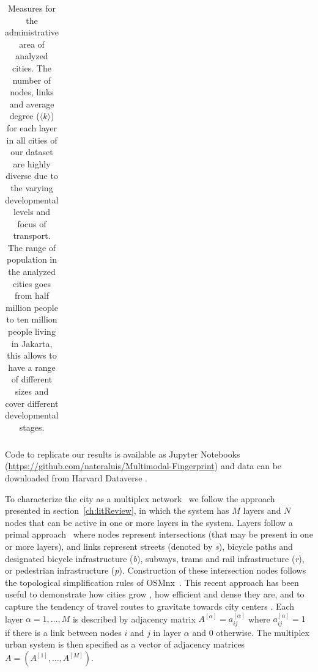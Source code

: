 \begin{table}[ht!]
\begin{adjustbox}{width=\textwidth,keepaspectratio}
\begin{tabular}{l|rrr|rrr|rrr|rrr|r}
		\end{tabular}
	\end{adjustbox}
	\caption[Layers measures for analyzed cities]{Measures for the administrative area of analyzed cities. The number of nodes, links and average degree ($\langle k \rangle$) for each layer in all cities of our dataset are highly diverse due to the varying developmental levels and focus of transport. The range of population in the analyzed cities goes from half million people to ten million people living in Jakarta, this allows to
		have a range of different sizes and cover different developmental stages.
		\label{tab:MultiplexCities}}
\end{table}

Code to replicate our results is available as Jupyter Notebooks (\url{https://github.com/nateraluis/Multimodal-Fingerprint}) and data can be downloaded from Harvard Dataverse \cite{natera2019data}.

To characterize the city as a multiplex network~\cite{boccaletti2014structure,kivela2014multilayer,battiston2017new} we follow the approach presented in section~\ref{ch:litReview}, in which the system has $M$ layers and $N$ nodes that can be active in one or more layers in the system. Layers follow a primal approach~\cite{porta2006primal} where nodes represent intersections (that may be present in one or more layers), and links represent streets (denoted by \textit{s}), bicycle paths and designated bicycle infrastructure (\textit{b}), subways, trams and rail infrastructure (\textit{r}), or pedestrian infrastructure (\textit{p}). Construction of these intersection nodes follows the topological simplification rules of OSMnx~\cite{boeing2017osmnx}. This recent approach has been useful to demonstrate how cities grow \cite{strano2012evolution,Barthelemy2013Evolution}, how efficient \cite{Gallotti2014Efficiency} and dense they are, and to capture the tendency of travel routes to gravitate towards city centers \cite{Lee2017Morphology}. Each layer $\alpha = 1,\dots, M$ is described by adjacency matrix $A^{[\alpha]} = {a^{[\alpha]}_{ij}}$ where $a^{[\alpha]}_{ij} = 1$ if there is a link between nodes $i$ and $j$ in layer $\alpha$ and 0 otherwise. The multiplex urban system is then specified as a vector of adjacency matrices $A = (A^{[1]},\dots,A^{[M]})$.

